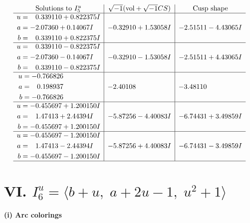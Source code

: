 \documentclass[1p]{elsarticle_modified}
\theoremstyle{definition}
\newcommand{\I}{\sqrt{-1}}
\begin{document}
$$\begin{array}{c|c|c}  
\text{Solutions to }I^u_{5}& \I (\text{vol} + \sqrt{-1}CS) & \text{Cusp shape}\\
 \hline 
\begin{aligned}
u &= \phantom{-}0.339110 + 0.822375 I \\
a &= -2.07360 + 0.14067 I \\
b &= \phantom{-}0.339110 + 0.822375 I\end{aligned}
 & -0.32910 + 1.53058 I & -2.51511 - 4.43065 I \\ \hline\begin{aligned}
u &= \phantom{-}0.339110 - 0.822375 I \\
a &= -2.07360 - 0.14067 I \\
b &= \phantom{-}0.339110 - 0.822375 I\end{aligned}
 & -0.32910 - 1.53058 I & -2.51511 + 4.43065 I \\ \hline\begin{aligned}
u &= -0.766826\phantom{ +0.000000I} \\
a &= \phantom{-}0.198937\phantom{ +0.000000I} \\
b &= -0.766826\phantom{ +0.000000I}\end{aligned}
 & -2.40108\phantom{ +0.000000I} & -3.48110\phantom{ +0.000000I} \\ \hline\begin{aligned}
u &= -0.455697 + 1.200150 I \\
a &= \phantom{-}1.47413 + 2.44394 I \\
b &= -0.455697 + 1.200150 I\end{aligned}
 & -5.87256 - 4.40083 I & -6.74431 + 3.49859 I \\ \hline\begin{aligned}
u &= -0.455697 - 1.200150 I \\
a &= \phantom{-}1.47413 - 2.44394 I \\
b &= -0.455697 - 1.200150 I\end{aligned}
 & -5.87256 + 4.40083 I & -6.74431 - 3.49859 I\\
 \hline 
 \end{array}$$\newpage\newpage\renewcommand{\arraystretch}{1}
\centering \section*{VI. $I^u_{6}= \langle b+u,\;a+2 u-1,\;u^2+1 \rangle$}
\flushleft \textbf{(i) Arc colorings}\\
\end{document}
